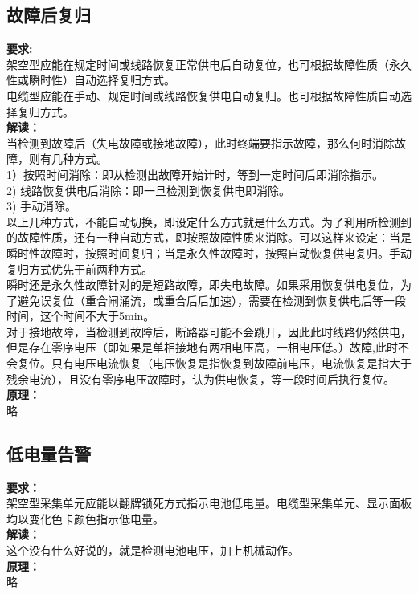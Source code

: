 \documentclass{article}
\begin{document}
\begin{CJK}{UTF8}{gbsn}
\subsection{故障后复归}
	\par
	\textbf{要求:}\\
	架空型应能在规定时间或线路恢复正常供电后自动复位，也可根据故障性质（永久性或瞬时性）自动选择复归方式。\\
	电缆型应能在手动、规定时间或线路恢复供电自动复归。也可根据故障性质自动选择复归方式。\\
	\textbf{解读：}\\
	当检测到故障后（失电故障或接地故障），此时终端要指示故障，那么何时消除故障，则有几种方式。\\
	1）按照时间消除：即从检测出故障开始计时，等到一定时间后即消除指示。\\	
	2) 线路恢复供电后消除：即一旦检测到恢复供电即消除。\\
	3) 手动消除。\\
	以上几种方式，不能自动切换，即设定什么方式就是什么方式。为了利用所检测到的故障性质，还有一种自动方式，即按照故障性质来消除。可以这样来设定：当是瞬时性故障时，按照时间复归；当是永久性故障时，按照自动恢复供电复归。手动复归方式优先于前两种方式。\\
	瞬时还是永久性故障针对的是短路故障，即失电故障。如果采用恢复供电复位，为了避免误复位（重合闸涌流，或重合后后加速），需要在检测到恢复供电后等一段时间，这个时间不大于5min。\\
	对于接地故障，当检测到故障后，断路器可能不会跳开，因此此时线路仍然供电，但是存在零序电压（即如果是单相接地有两相电压高，一相电压低。）故障,此时不会复位。只有电压电流恢复（电压恢复是指恢复到故障前电压，电流恢复是指大于残余电流），且没有零序电压故障时，认为供电恢复，等一段时间后执行复位。\\
	\textbf{原理：}\\
	略

\subsection{ 低电量告警}
	\par
	\textbf{要求：}\\
	架空型采集单元应能以翻牌锁死方式指示电池低电量。电缆型采集单元、显示面板均以变化色卡颜色指示低电量。\\
	\textbf{解读：}\\
	这个没有什么好说的，就是检测电池电压，加上机械动作。\\
	\textbf{原理：}\\
	略

\end{CJK}
\end{document}
